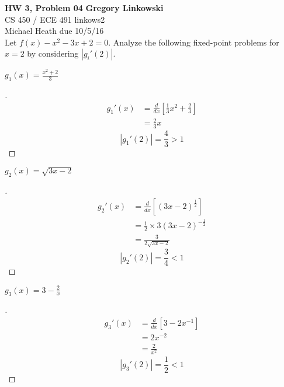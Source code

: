 \documentclass[12pt]{article}
\newenvironment{exercise}[2][Exercise]{\begin{trivlist}
\item[\hskip \labelsep {\bfseries #1}\hskip \labelsep {\bfseries #2.}]}{\end{trivlist}}
\begin{document}
\noindent
\large\textbf{HW 3, Problem 04} \hfill \textbf{Gregory Linkowski} \\
\normalsize CS 450 / ECE 491 \hfill linkows2 \\
Michael Heath \hfill due 10/5/16 \\



\vspace{5mm}
Let	$ f(x) - x^2 - 3x + 2 = 0 $.
Analyze the following fixed-point problems for $x=2$ by considering $|g_i'(2)|$.
\vspace{5mm}

\begin{exercise}{1} $g_1(x) = \frac{x^2 + 2}{3}$
\end{exercise}
\begin{proof}[]
	\vspace{-8mm}
	\begin{align*}
		g_1'(x) &= \frac{d}{dx}\left[  \frac{1}{3}x^2 + \frac{2}{3} \right] \\
		 &= \frac{2}{3}x
	\end{align*}
	\[\boxed{ \; |g_1'(2)| = \frac{4}{3} > 1 \; }\]
\end{proof}

\begin{exercise}{2} $g_2(x) = \sqrt{3x - 2}$
\end{exercise}
\begin{proof}[]
	\vspace{-8mm}
	\begin{align*}
		g_2'(x) &= \frac{d}{dx}\left[  (3x - 2)^{\frac{1}{2}} \right] \\
		&= \frac{1}{2} \times 3 (3x - 2)^{-\frac{1}{2}} \\
		&= \frac{3}{2 \sqrt{3x - 2}}
	\end{align*}
	\[\boxed{ \; |g_2'(2)| = \frac{3}{4} < 1 \; }\] 
\end{proof}

\begin{exercise}{3} $g_3(x) = 3 - \frac{2}{x}$
\end{exercise}
\begin{proof}[]
	\vspace{-8mm}
	\begin{align*}
		g_3'(x) &= \frac{d}{dx}\left[  3 - 2x^{-1} \right] \\
		&= 2x^{-2} \\
		&= \frac{2}{x^2}
	\end{align*}
	\[\boxed{ \; |g_3'(2)| = \frac{1}{2} < 1 \; }\] 
\end{proof}
\end{document}
